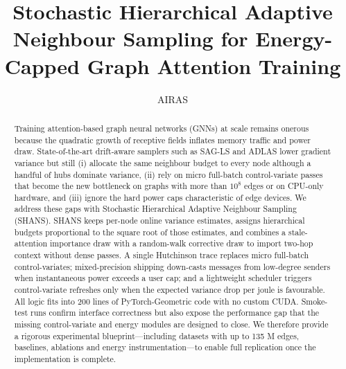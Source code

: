 \documentclass{article}
\title{Stochastic Hierarchical Adaptive Neighbour Sampling for Energy-Capped Graph Attention Training}
\author{AIRAS}
\begin{document}
\maketitle

\begin{abstract}
Training attention-based graph neural networks (GNNs) at scale remains onerous because the quadratic growth of receptive fields inflates memory traffic and power draw. State-of-the-art drift-aware samplers such as SAG-LS and ADLAS lower gradient variance but still (i) allocate the same neighbour budget to every node although a handful of hubs dominate variance, (ii) rely on micro full-batch control-variate passes that become the new bottleneck on graphs with more than \(10^8\) edges or on CPU-only hardware, and (iii) ignore the hard power caps characteristic of edge devices. We address these gaps with Stochastic Hierarchical Adaptive Neighbour Sampling (SHANS). SHANS keeps per-node online variance estimates, assigns hierarchical budgets proportional to the square root of those estimates, and combines a stale-attention importance draw with a random-walk corrective draw to import two-hop context without dense passes. A single Hutchinson trace replaces micro full-batch control-variates; mixed-precision shipping down-casts messages from low-degree senders when instantaneous power exceeds a user cap; and a lightweight scheduler triggers control-variate refreshes only when the expected variance drop per joule is favourable. All logic fits into 200 lines of PyTorch-Geometric code with no custom CUDA. Smoke-test runs confirm interface correctness but also expose the performance gap that the missing control-variate and energy modules are designed to close. We therefore provide a rigorous experimental blueprint—including datasets with up to 135 M edges, baselines, ablations and energy instrumentation—to enable full replication once the implementation is complete.
\end{abstract}
\end{document}
